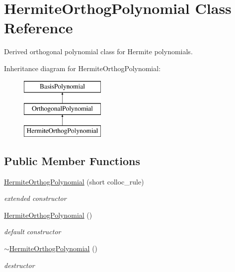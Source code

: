 \section{Hermite\+Orthog\+Polynomial Class Reference}
\label{classPecos_1_1HermiteOrthogPolynomial}


Derived orthogonal polynomial class for Hermite polynomials.  


Inheritance diagram for Hermite\+Orthog\+Polynomial\+:\begin{figure}[H]
\begin{center}
\leavevmode
\includegraphics[height=3.000000cm]{classPecos_1_1HermiteOrthogPolynomial}
\end{center}
\end{figure}
\subsection*{Public Member Functions}
\begin{DoxyCompactItemize}
\item 
\hyperlink{classPecos_1_1HermiteOrthogPolynomial_a31e12af801682b17d3a4bfa2c9909a39}{Hermite\+Orthog\+Polynomial} (short colloc\+\_\+rule)\label{classPecos_1_1HermiteOrthogPolynomial_a31e12af801682b17d3a4bfa2c9909a39}

\begin{DoxyCompactList}\small\item\em extended constructor \end{DoxyCompactList}\item 
\hyperlink{classPecos_1_1HermiteOrthogPolynomial_ae2079621617f6eb4c03fbd90e4e3d2fa}{Hermite\+Orthog\+Polynomial} ()\label{classPecos_1_1HermiteOrthogPolynomial_ae2079621617f6eb4c03fbd90e4e3d2fa}

\begin{DoxyCompactList}\small\item\em default constructor \end{DoxyCompactList}\item 
\hyperlink{classPecos_1_1HermiteOrthogPolynomial_a7036e911ad89269a5f40157e0562de19}{$\sim$\+Hermite\+Orthog\+Polynomial} ()\label{classPecos_1_1HermiteOrthogPolynomial_a7036e911ad89269a5f40157e0562de19}

\begin{DoxyCompactList}\small\item\em destructor \end{DoxyCompactList}\end{DoxyCompactItemize}
